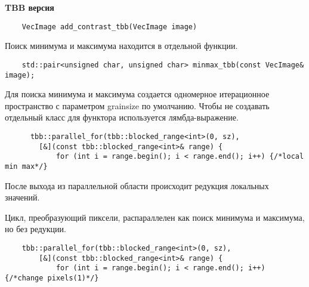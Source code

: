 \documentclass{report}
\begin{document}
    \newpage
    \textbf{TBB версия}
    \begin{lstlisting}
    VecImage add_contrast_tbb(VecImage image)
    \end{lstlisting}
    \par Поиск минимума и максимума находится в отдельной функции.
    \begin{lstlisting}
    std::pair<unsigned char, unsigned char> minmax_tbb(const VecImage& image);
    \end{lstlisting}
    \par Для поиска минимума и максимума создается одномерное итерационное пространство с параметром grainsize по умолчанию. Чтобы не создавать отдельный класс для функтора используется лямбда-выражение.
    \begin{lstlisting}
      tbb::parallel_for(tbb::blocked_range<int>(0, sz),
        [&](const tbb::blocked_range<int>& range) {
            for (int i = range.begin(); i < range.end(); i++) {/*local min max*/}
    \end{lstlisting}
    После выхода из параллельной области происходит редукция локальных значений.
    \par Цикл, преобразующий пиксели, распараллелен как поиск минимума и максимума, но без редукции.
    \begin{lstlisting}
    tbb::parallel_for(tbb::blocked_range<int>(0, sz),
        [&](const tbb::blocked_range<int>& range) {
            for (int i = range.begin(); i < range.end(); i++) {/*change pixels(1)*/}
    \end{lstlisting}    
\end{document}
